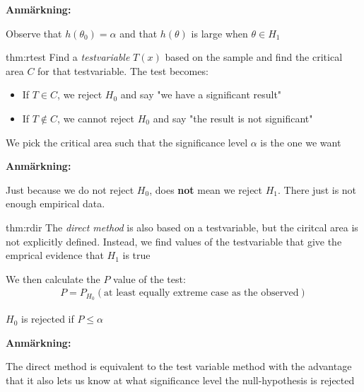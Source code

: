 \par\bigskip
\noindent\textbf{Anmärkning:}\par
\noindent Observe that $h(\theta_0) = \alpha$ and that $h(\theta)$ is large when $\theta\in H_1$
\par\bigskip
\begin{theo}{thm:rtest}
  Find a \textit{testvariable} $T(x)$ based on the sample and find the critical area $C$ for that testvariable. The test becomes:\par
  \begin{itemize}
    \item If $T\in C$, we reject $H_0$ and say "we have a significant result"
    \item If $T\not\in C$, we cannot reject $H_0$ and say "the result is not significant"
  \end{itemize}
  \par\bigskip
  \noindent We pick the critical area such that the significance level $\alpha$ is the one we want 
\end{theo}
\par\bigskip
\noindent\textbf{Anmärkning:}\par
\noindent Just because we do not reject $H_0$, does \textbf{not} mean we reject $H_1$. There just is not enough empirical data.
\par\bigskip
\begin{theo}{thm:rdir}
  The \textit{direct method} is also based on a testvariable, but the ciritcal area is not explicitly defined. Instead, we find values of the testvariable that give the emprical evidence that $H_1$ is true
  \par\bigskip
  \noindent We then calculate the $P$ value of the test:
  \begin{equation*}
    \begin{gathered}
      P = P_{H_0}({\text{at least equally extreme case as the observed}})
    \end{gathered}
  \end{equation*}
  \par\bigskip
  \noindent $H_0$ is rejected if $P\leq\alpha$
\end{theo}
\par\bigskip
\noindent\textbf{Anmärkning:}\par
\noindent The direct method is equivalent to the test variable method with the advantage that it also lets us know at what significance level the null-hypothesis is rejected
\par\bigskip
